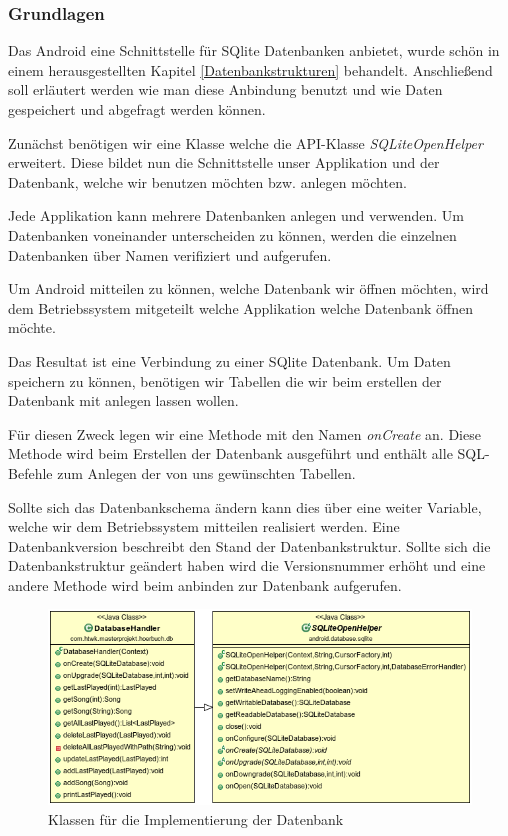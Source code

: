 \subsubsection{Grundlagen}
Das Android eine Schnittstelle für SQlite Datenbanken anbietet, wurde schön in einem herausgestellten Kapitel \ref{Datenbankstrukturen} behandelt. Anschließend soll erläutert werden wie man diese Anbindung benutzt und wie Daten gespeichert und abgefragt werden können.

Zunächst benötigen wir eine Klasse welche die API-Klasse \textit{SQLiteOpenHelper} erweitert. Diese bildet nun die Schnittstelle unser Applikation und der Datenbank, welche wir benutzen möchten bzw. anlegen möchten.

Jede Applikation kann mehrere Datenbanken anlegen und verwenden. Um Datenbanken voneinander unterscheiden zu können, werden die einzelnen Datenbanken über Namen verifiziert und aufgerufen.

Um Android mitteilen zu können, welche Datenbank wir öffnen möchten, wird dem Betriebssystem mitgeteilt welche Applikation welche Datenbank öffnen möchte.

Das Resultat ist eine Verbindung zu einer SQlite Datenbank. Um Daten speichern zu können, benötigen wir Tabellen die wir beim erstellen der Datenbank mit anlegen lassen wollen.

Für diesen Zweck legen wir eine Methode mit den Namen \textit{onCreate} an. Diese Methode wird beim Erstellen der Datenbank ausgeführt und enthält alle SQL-Befehle zum Anlegen der von uns gewünschten Tabellen.

Sollte sich das Datenbankschema ändern kann dies über eine weiter Variable, welche wir dem Betriebssystem mitteilen realisiert werden. Eine Datenbankversion beschreibt den Stand der Datenbankstruktur. Sollte sich die Datenbankstruktur geändert haben wird die Versionsnummer erhöht und eine andere Methode wird beim anbinden zur Datenbank aufgerufen.


\begin{figure}
\begin{center}
\includegraphics[scale=0.7]{images/database}
\caption{Klassen für die Implementierung der Datenbank}
\label{database}
\end{center}
\end{figure}


